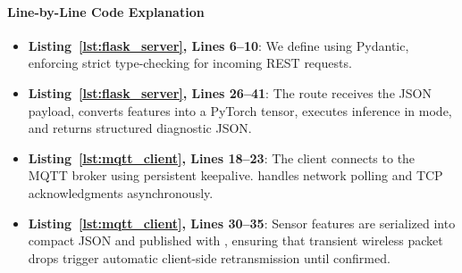 \paragraph{Line-by-Line Code Explanation}
\begin{itemize}
    \item \textbf{Listing~\ref{lst:flask_server}, Lines 6--10}: We define  using Pydantic, enforcing strict type-checking for incoming REST requests.
    \item \textbf{Listing~\ref{lst:flask_server}, Lines 26--41}: The  route receives the JSON payload, converts features into a PyTorch tensor, executes inference in  mode, and returns structured diagnostic JSON.
    \item \textbf{Listing~\ref{lst:mqtt_client}, Lines 18--23}: The client connects to the MQTT broker using persistent keepalive.  handles network polling and TCP acknowledgments asynchronously.
    \item \textbf{Listing~\ref{lst:mqtt_client}, Lines 30--35}: Sensor features are serialized into compact JSON and published with , ensuring that transient wireless packet drops trigger automatic client-side retransmission until confirmed.
\end{itemize}

